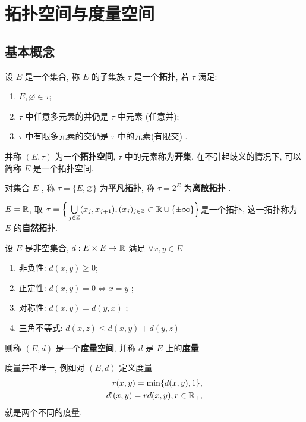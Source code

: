 \chapter{拓扑空间与度量空间}
\section{基本概念}

 \begin{Def}[拓扑空间]\label{def:拓扑空间}
      设 $ E $ 是一个集合, 称 $ E $ 的子集族 $ \tau $ 是一个\textbf{拓扑}, 若 $ \tau $ 满足: 
     \begin{enumerate}[(1)]
          \item $ E, \varnothing\in \tau $;
          \item $ \tau $ 中任意多元素的并仍是 $ \tau $ 中元素 (任意并);
          \item $ \tau $ 中有限多元素的交仍是 $ \tau $ 中的元素(有限交) . 
     \end{enumerate}
     并称 $ (E, \tau) $ 为一个\textbf{拓扑空间}, $ \tau $ 中的元素称为\textbf{开集}, 在不引起歧义的情况下, 可以简称 $ E $ 是一个拓扑空间. 
 \end{Def}
 \begin{Rmk}\label{rmk:平凡离散}
      对集合 $ E $ , 称 $ \tau=\{ E, \varnothing \} $ 为\textbf{平凡拓扑}, 称 $ \tau=2^{E} $ 为\textbf{离散拓扑} . 
 \end{Rmk}
 \begin{Ex}
      $ E=\mathbb{R} $, 取 $ \tau=\Big\{ \bigcup\limits_{j\in\mathbb{Z}}(x_{j}, x_{j+1}), (x_{j})_{j\in\mathbb{Z}}\subset \mathbb{R}\cup\{ \pm\infty \} \Big\} $是一个拓扑, 这一拓扑称为 $ E $ 的\textbf{自然拓扑}. 
 \end{Ex}
 \begin{Def}[度量空间]\label{def:度量空间}
      设 $ E $ 是非空集合, $ d: E\times E\to \mathbb{R} $ 满足 $ \forall x, y\in E $
      \begin{enumerate}[(1)]
           \item 非负性: $ d(x, y)\geqslant 0 $;
           \item 正定性: $ d(x, y)=0\Leftrightarrow x=y $ ;
           \item 对称性: $ d(x, y)=d(y, x) $ ;
           \item 三角不等式: $ d(x, z)\leqslant d(x, y)+d(y, z) $ 
      \end{enumerate}
      则称 $ (E, d) $ 是一个\textbf{度量空间}, 并称 $ d $ 是 $ E $ 上的\textbf{度量}
 \end{Def}
 \begin{Rmk}\label{rmk:度量不唯一}
      度量并不唯一, 例如对 $ (E, d) $ 定义度量
      \begin{equation*}
          \begin{aligned}
               r(x, y) = \min\{ d(x, y), 1 \}, \\
               d'(x, y) = rd(x, y), r\in\mathbb{R}_{+},
          \end{aligned}
      \end{equation*}
      就是两个不同的度量. 
 \end{Rmk}
 
